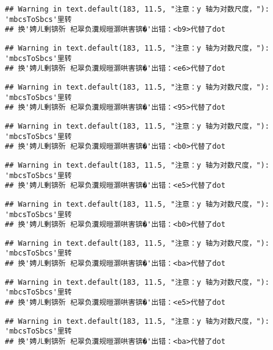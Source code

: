 \documentclass[
]{article}
\begin{document}
\begin{verbatim}
## Warning in text.default(183, 11.5, "注意：y 轴为对数尺度，"): 'mbcsToSbcs'里转
## 换'娉ㄦ剰锛歽 杞翠负瀵规暟灏哄害锛�'出错：<b9>代替了dot
\end{verbatim}

\begin{verbatim}
## Warning in text.default(183, 11.5, "注意：y 轴为对数尺度，"): 'mbcsToSbcs'里转
## 换'娉ㄦ剰锛歽 杞翠负瀵规暟灏哄害锛�'出错：<e6>代替了dot
\end{verbatim}

\begin{verbatim}
## Warning in text.default(183, 11.5, "注意：y 轴为对数尺度，"): 'mbcsToSbcs'里转
## 换'娉ㄦ剰锛歽 杞翠负瀵规暟灏哄害锛�'出错：<95>代替了dot
\end{verbatim}

\begin{verbatim}
## Warning in text.default(183, 11.5, "注意：y 轴为对数尺度，"): 'mbcsToSbcs'里转
## 换'娉ㄦ剰锛歽 杞翠负瀵规暟灏哄害锛�'出错：<b0>代替了dot
\end{verbatim}

\begin{verbatim}
## Warning in text.default(183, 11.5, "注意：y 轴为对数尺度，"): 'mbcsToSbcs'里转
## 换'娉ㄦ剰锛歽 杞翠负瀵规暟灏哄害锛�'出错：<e5>代替了dot
\end{verbatim}

\begin{verbatim}
## Warning in text.default(183, 11.5, "注意：y 轴为对数尺度，"): 'mbcsToSbcs'里转
## 换'娉ㄦ剰锛歽 杞翠负瀵规暟灏哄害锛�'出错：<b0>代替了dot
\end{verbatim}

\begin{verbatim}
## Warning in text.default(183, 11.5, "注意：y 轴为对数尺度，"): 'mbcsToSbcs'里转
## 换'娉ㄦ剰锛歽 杞翠负瀵规暟灏哄害锛�'出错：<ba>代替了dot
\end{verbatim}

\begin{verbatim}
## Warning in text.default(183, 11.5, "注意：y 轴为对数尺度，"): 'mbcsToSbcs'里转
## 换'娉ㄦ剰锛歽 杞翠负瀵规暟灏哄害锛�'出错：<e5>代替了dot
\end{verbatim}

\begin{verbatim}
## Warning in text.default(183, 11.5, "注意：y 轴为对数尺度，"): 'mbcsToSbcs'里转
## 换'娉ㄦ剰锛歽 杞翠负瀵规暟灏哄害锛�'出错：<ba>代替了dot
\end{verbatim}
\end{document}
